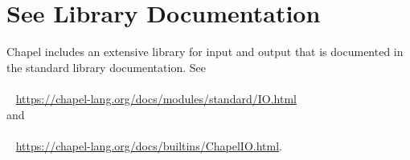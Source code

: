 \label{Input_and_Output}

\section{See Library Documentation}

Chapel includes an extensive library for input and output that is
documented in the standard library documentation. See
\\ %
\mbox{$$ $$ $$ $$ $$} %
\url{https://chapel-lang.org/docs/modules/standard/IO.html}
\\
and
\\ %
\mbox{$$ $$ $$ $$ $$} %
\url{https://chapel-lang.org/docs/builtins/ChapelIO.html}.

